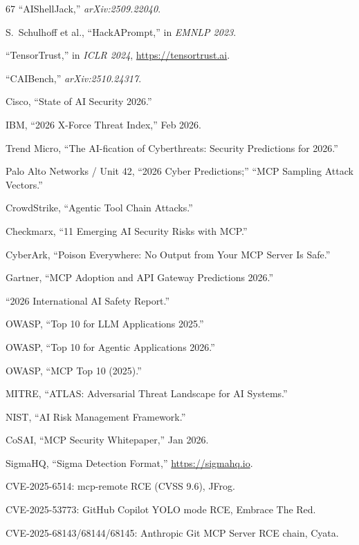 \documentclass[11pt,letterpaper]{article}
\begin{document}
\begin{thebibliography}{67}
``AIShellJack,'' \textit{arXiv:2509.22040}.

S.~Schulhoff et al., ``HackAPrompt,'' in \textit{EMNLP 2023}.

``TensorTrust,'' in \textit{ICLR 2024}, \url{https://tensortrust.ai}.

``CAIBench,'' \textit{arXiv:2510.24317}.

Cisco, ``State of AI Security 2026.''

IBM, ``2026 X-Force Threat Index,'' Feb 2026.

Trend Micro, ``The AI-fication of Cyberthreats: Security Predictions for 2026.''

Palo Alto Networks / Unit 42, ``2026 Cyber Predictions;'' ``MCP Sampling Attack Vectors.''

CrowdStrike, ``Agentic Tool Chain Attacks.''

Checkmarx, ``11 Emerging AI Security Risks with MCP.''

CyberArk, ``Poison Everywhere: No Output from Your MCP Server Is Safe.''

Gartner, ``MCP Adoption and API Gateway Predictions 2026.''

``2026 International AI Safety Report.''

OWASP, ``Top 10 for LLM Applications 2025.''

OWASP, ``Top 10 for Agentic Applications 2026.''

OWASP, ``MCP Top 10 (2025).''

MITRE, ``ATLAS: Adversarial Threat Landscape for AI Systems.''

NIST, ``AI Risk Management Framework.''

CoSAI, ``MCP Security Whitepaper,'' Jan 2026.

SigmaHQ, ``Sigma Detection Format,'' \url{https://sigmahq.io}.

CVE-2025-6514: mcp-remote RCE (CVSS 9.6), JFrog.

CVE-2025-53773: GitHub Copilot YOLO mode RCE, Embrace The Red.

CVE-2025-68143/68144/68145: Anthropic Git MCP Server RCE chain, Cyata.


\end{thebibliography}
\end{document}
